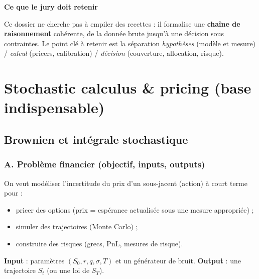 \documentclass[11pt,a4paper]{report}
\theoremstyle{definition}
\theoremstyle{plain}
\theoremstyle{remark}
\newcommand{\1}{\mathbf{1}}
\newcommand{\filepath}[1]{\texttt{\detokenize{#1}}}
\newcommand{\codeid}[1]{\texttt{\detokenize{#1}}}
\newenvironment{jurybox}{
\par\medskip
\begin{lrbox}{\juryboxbox}
\begin{minipage}{0.97\textwidth}
\textbf{Ce que le jury doit retenir}\par\smallskip
\ignorespaces
}{
\unskip\end{minipage}
\end{lrbox}
\noindent\fcolorbox{black!30}{black!3}{\usebox{\juryboxbox}}
\par\medskip
}
\begin{document}

\begin{jurybox}
Ce dossier ne cherche pas à empiler des recettes : il formalise une \textbf{chaîne de raisonnement} cohérente, de la donnée brute jusqu'à une décision sous contraintes. Le point clé à retenir est la séparation \emph{hypothèses} (modèle et mesure) / \emph{calcul} (pricers, calibration) / \emph{décision} (couverture, allocation, risque).
\end{jurybox}

\part{Stochastic calculus \& pricing (base indispensable)}

\chapter{Brownien et intégrale stochastique}

\section{A. Problème financier (objectif, inputs, outputs)}
On veut modéliser l'incertitude du prix d'un sous-jacent (action) à court terme pour :
\begin{itemize}[leftmargin=*]
\item pricer des options (prix = espérance actualisée sous une mesure appropriée) ;
\item simuler des trajectoires (Monte Carlo) ;
\item construire des risques (grecs, PnL, mesures de risque).
\end{itemize}
\textbf{Input} : paramètres $(S_0,r,q,\sigma,T)$ et un générateur de bruit. \textbf{Output} : une trajectoire $S_t$ (ou une loi de $S_T$).
\end{document}
